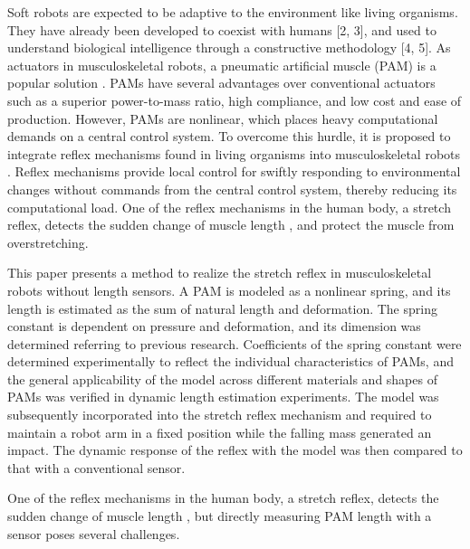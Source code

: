 Soft robots are expected to be adaptive to the environment like living organisms\cite{rus_design_2015}. They have already been developed to coexist with humans [2, 3], and used to understand biological intelligence through a constructive methodology [4, 5]. As actuators in musculoskeletal robots, a pneumatic artificial muscle (PAM) is a popular solution \cite{mirvakili_artificial}. PAMs have several advantages over conventional actuators such as a superior power-to-mass ratio\cite{Dynamic}, high compliance\cite{SDCharacteristics}, and low cost and ease of production\cite{ashwin_survey_2018}.
However, PAMs are nonlinear, which places heavy computational demands on a central control system.
To overcome this hurdle, it is proposed to integrate reflex mechanisms found in living organisms into musculoskeletal robots \cite{takahashi}.
Reflex mechanisms provide local control for swiftly responding to environmental changes without commands from the central control system, thereby reducing its computational load. 
One of the reflex mechanisms in the human body, a stretch reflex, detects the sudden change of muscle length \cite{kandel}, and protect the muscle from overstretching.

This paper presents a method to realize the stretch reflex in musculoskeletal robots without length sensors. A PAM is modeled as a nonlinear spring, and its length is estimated as the sum of natural length and deformation. The spring constant is dependent on pressure and deformation, and its dimension was determined referring to previous research. Coefficients of the spring constant were determined experimentally to reflect the individual characteristics of PAMs, and the general applicability of the model across different materials and shapes of PAMs was verified in dynamic length estimation experiments. The model was subsequently incorporated into the stretch reflex mechanism and required to maintain a robot arm in a fixed position while the falling mass generated an impact. The dynamic response of the reflex with the model was then compared to that with a conventional sensor. 



One of the reflex mechanisms in the human body, a stretch reflex, detects the sudden change of muscle length \cite{kandel}, but directly measuring PAM length with a sensor poses several challenges\cite{nakajima}.


